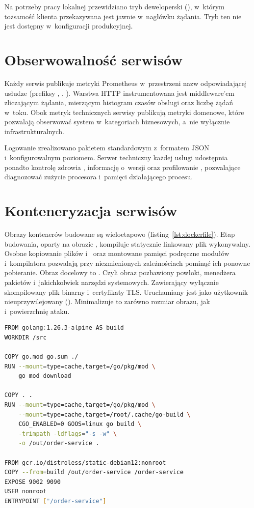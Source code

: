 Na potrzeby pracy lokalnej przewidziano tryb deweloperski (), w~którym tożsamość
klienta przekazywana jest jawnie w~nagłówku żądania. Tryb ten nie jest dostępny w~konfiguracji produkcyjnej.

\section{Obserwowalność serwisów}
\label{sec:obserwowalnosc-serwisow}

Każdy serwis publikuje metryki Prometheus w~przestrzeni nazw odpowiadającej usłudze (prefiksy ,
, ). Warstwa HTTP instrumentowana jest middleware'em zliczającym żądania, mierzącym histogram czasów
obsługi oraz liczbę żądań w~toku. Obok metryk technicznych serwisy publikują metryki domenowe, które pozwalają obserwować system
w~kategoriach biznesowych, a~nie wyłącznie infrastrukturalnych.

Logowanie zrealizowano pakietem standardowym  z~formatem JSON i~konfigurowalnym poziomem. Serwer
techniczny każdej usługi udostępnia ponadto kontrolę zdrowia , informację o~wersji 
oraz profilowanie , pozwalające diagnozować zużycie procesora i~pamięci działającego procesu.

\section{Konteneryzacja serwisów}
\label{sec:konteneryzacja-serwisow}

Obrazy kontenerów budowane są wieloetapowo (listing~\ref{lst:dockerfile}). Etap budowania, oparty na obrazie
, kompiluje statycznie linkowany plik wykonywalny. Osobne kopiowanie plików
 i~ oraz montowane pamięci podręczne modułów i~kompilatora pozwalają przy niezmienionych
zależnościach pominąć ich ponowne pobieranie. Obraz docelowy to . Czyli obraz pozbawiony
powłoki, menedżera pakietów i~jakichkolwiek narzędzi systemowych. Zawierający wyłącznie skompilowany plik binarny
i~certyfikaty TLS. Uruchamiany jest jako użytkownik nieuprzywilejowany (). Minimalizuje to zarówno
rozmiar obrazu, jak i~powierzchnię ataku.

\begin{lstlisting}[caption={Wieloetapowy Dockerfile serwisu zamówień},label={lst:dockerfile},language=bash]
FROM golang:1.26.3-alpine AS build
WORKDIR /src

COPY go.mod go.sum ./
RUN --mount=type=cache,target=/go/pkg/mod \
    go mod download

COPY . .
RUN --mount=type=cache,target=/go/pkg/mod \
    --mount=type=cache,target=/root/.cache/go-build \
    CGO_ENABLED=0 GOOS=linux go build \
    -trimpath -ldflags="-s -w" \
    -o /out/order-service .

FROM gcr.io/distroless/static-debian12:nonroot
COPY --from=build /out/order-service /order-service
EXPOSE 9002 9090
USER nonroot
ENTRYPOINT ["/order-service"]
\end{lstlisting}

